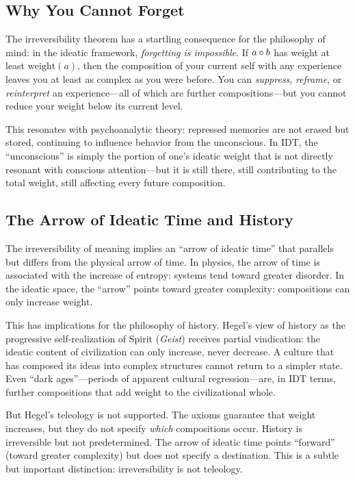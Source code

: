 \subsection{Why You Cannot Forget}

The irreversibility theorem has a startling consequence for the philosophy of
mind: in the ideatic framework, \emph{forgetting is impossible}.  If
$a \circ b$ has weight at least $\mathrm{weight}(a)$, then the
composition of your current self with any experience leaves you at least
as complex as you were before.  You can \emph{suppress}, \emph{reframe},
or \emph{reinterpret} an experience---all of which are further
compositions---but you cannot reduce your weight below its current level.

This resonates with psychoanalytic theory: repressed memories are not erased
but stored, continuing to influence behavior from the unconscious.  In IDT,
the ``unconscious'' is simply the portion of one's ideatic weight that is not
directly resonant with conscious attention---but it is still there, still
contributing to the total weight, still affecting every future composition.

\subsection{The Arrow of Ideatic Time and History}

The irreversibility of meaning implies an ``arrow of ideatic time'' that
parallels but differs from the physical arrow of time.  In physics, the
arrow of time is associated with the increase of entropy: systems tend toward
greater disorder.  In the ideatic space, the ``arrow'' points toward greater
complexity: compositions can only increase weight.

This has implications for the philosophy of history.  Hegel's view of history
as the progressive self-realization of Spirit (\textit{Geist}) receives partial
vindication: the ideatic content of civilization can only increase, never
decrease.  A culture that has composed its ideas into complex structures
cannot return to a simpler state.  Even ``dark ages''---periods of apparent
cultural regression---are, in IDT terms, further compositions that add weight
to the civilizational whole.

But Hegel's teleology is not supported.  The axioms guarantee that weight
increases, but they do not specify \emph{which} compositions occur.  History
is irreversible but not predetermined.  The arrow of ideatic time points
``forward'' (toward greater complexity) but does not specify a destination.
This is a subtle but important distinction: irreversibility is not teleology.

